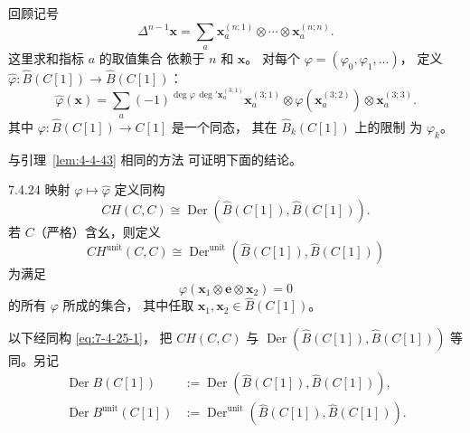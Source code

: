 回顾记号
\[
\Delta^{n-1}\mathbf x
=\sum_a
\mathbf x_a^{(n;1)}\otimes\cdots\otimes
\mathbf x_a^{(n;n)}.
\]
这里求和指标 $a$ 的取值集合
依赖于 $n$ 和 $\mathbf x$。
对每个 $\varphi=(\varphi_0,\varphi_1,\ldots)$，
定义
$\widehat\varphi:
\widehat B(C[1])\to\widehat B(C[1])$：
\begin{equation}
\widehat\varphi(\mathbf x)
=\sum_a
(-1)^{\deg\varphi\,\deg'\mathbf x_a^{(3;1)}}
\mathbf x_a^{(3;1)}
\otimes\varphi(\mathbf x_a^{(3;2)})
\otimes\mathbf x_a^{(3;3)}.
\tag{7.4.23}\label{eq:7-4-23}
\end{equation}
其中
$\varphi:\widehat B(C[1])\to C[1]$
是一个同态，
其在 $\widehat B_k(C[1])$ 上的限制
为 $\varphi_k$。

与引理~\ref{lem:4-4-43} 相同的方法
可证明下面的结论。

\begin{lemma}{7.4.24}\label{lem:7-4-24}
映射 $\varphi\mapsto\widehat\varphi$
定义同构
\begin{equation}
CH(C,C)\cong
\operatorname{Der}
(\widehat B(C[1]),\widehat B(C[1])).
\tag{7.4.25.1}\label{eq:7-4-25-1}
\end{equation}
若 $C$（严格）含幺，则定义
\begin{equation}
CH^{\mathrm{unit}}(C,C)\cong
\operatorname{Der}^{\mathrm{unit}}
(\widehat B(C[1]),\widehat B(C[1]))
\tag{7.4.25.2}\label{eq:7-4-25-2}
\end{equation}
为满足
\[
\varphi(\mathbf x_1\otimes\mathbf e\otimes
\mathbf x_2)=0
\]
的所有 $\varphi$ 所成的集合，
其中任取
$\mathbf x_1,\mathbf x_2\in
\widehat B(C[1])$。
\end{lemma}

以下经同构
\eqref{eq:7-4-25-1}，
把 $CH(C,C)$ 与
$\operatorname{Der}
(\widehat B(C[1]),\widehat B(C[1]))$
等同。另记
\[
\begin{aligned}
\operatorname{Der}B(C[1])
&:=\operatorname{Der}
(\widehat B(C[1]),\widehat B(C[1])),\\
\operatorname{Der}B^{\mathrm{unit}}(C[1])
&:=\operatorname{Der}^{\mathrm{unit}}
(\widehat B(C[1]),\widehat B(C[1])).
\end{aligned}
\]
